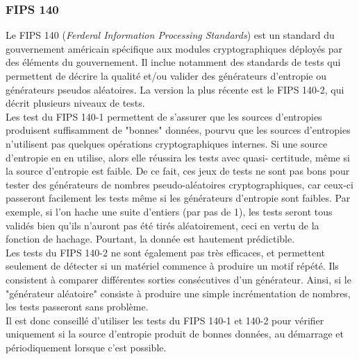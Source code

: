 	\subsubsection{FIPS 140}
	
		Le FIPS 140 (\textit{Ferderal Information Processing Standards}) est un 
		standard du gouvernement américain spécifique aux modules cryptographiques 
		déployés par des éléments du gouvernement. Il inclue notamment des standards 
		de tests qui permettent de  décrire la qualité et/ou valider des 
		générateurs d'entropie ou générateurs pseudos aléatoires. 
		La version la plus récente est le FIPS 140-2, qui décrit plusieurs 
		niveaux de tests.\\
		
		
		Les test du FIPS 140-1 permettent de s'assurer que les sources d'entropies 
		produisent suffisamment de "bonnes" données, pourvu que les sources d'entropies 
		n'utilisent pas quelques opérations cryptographiques internes. Si une source d'entropie en  en utilise, 
		alors elle réussira les tests avec quasi- certitude, même si la source 
		d'entropie est faible. De ce fait,  ces jeux de tests ne sont pas bons 
		pour tester des générateurs de nombres pseudo-aléatoires cryptographiques, 
		car ceux-ci passeront facilement les tests même si les générateurs d'entropie 
		sont faibles. Par exemple, si l'on hache une suite d'entiers (par pas de 1), 
		les tests seront tous validés bien qu'ils n'auront pas été tirés aléatoirement, 
		ceci en vertu de la fonction de hachage. Pourtant, la donnée est hautement
		prédictible.\\
		
		
		Les tests du FIPS 140-2 ne sont également pas très efficaces, et permettent seulement de détecter si un matériel 
		commence à produire un motif répété. Ils consistent à comparer différentes sorties 
		consécutives d'un générateur.  Ainsi, si le "générateur aléatoire" consiste 
		à produire une simple incrémentation de nombres, les tests passeront sans problème.\\
		
		
		Il est donc conseillé d'utiliser les tests du FIPS 140-1 et 140-2 pour vérifier uniquement 
		si la source d'entropie produit de bonnes données, au démarrage et périodiquement 
		lorsque c'est possible. \\
		
		
		
